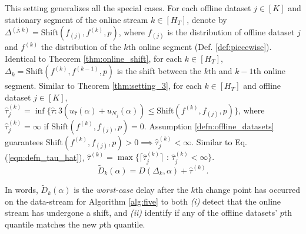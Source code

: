 \label{sec:general_setting}
This setting generalizes all the special cases. 
For each offline dataset $j \in [K]$ and stationary segment of the online stream $k \in [H_T]$, denote by  $\Delta^{(j;k)} = \text{Shift}(f_{(j)}, f^{(k)},p)$, where $f_{(j)}$ is the distribution of offline dataset $j$ and $f^{(k)}$ the distribution of the $k$th online segment (Def. \ref{def:piecewise}). Identical to Theorem \ref{thm:online_shift}, for each $k \in [H_T]$,  $\Delta_k =  \text{Shift} (f^{(k)},f^{(k-1)},p)$ is the shift between the $k$th and $k-1$th online segment. Similar to Theorem \ref{thm:setting_3}, for each $k \in [H_T]$ and offline dataset $j \in [K]$,  $\widehat{\tau}_j^{(k)} = \inf \{ \widehat{\tau}: 3(u_{\widehat{\tau}}(\alpha) + u_{N_j}(\alpha)) \leq \text{Shift}(f^{(k)},f_{(j)},p) \}$, where $\widehat{\tau}_j^{(k)} = \infty$ if $\text{Shift}(f^{(k)},f_{(j)},p)=0$.  Assumption \ref{defn:offline_datasets} guarantees $\text{Shift}(f^{(k)},f_{(j)},p)>0\implies\widehat{\tau}_j^{(k)}  < \infty$. Similar to Eq. (\ref{eqn:defn_tau_hat}),  $\widehat{\tau}^{(k)} = \max \{ \lceil \widehat{\tau}_j^{(k)} \rceil \text{ : } \widehat{\tau}_j^{(k)}  < \infty \}.$
\begin{equation}
    \widetilde{D}_k(\alpha) = D(\Delta_k,\alpha) + \widehat{\tau}^{(k)}.
    \label{eqn:D_tilde}
\end{equation}

In words, $\widetilde{D}_k(\alpha)$ is the \emph{worst-case} delay after the $k$th change point has occurred on the data-stream for Algorithm \ref{alg:five} to both {\em(i)} detect that the online stream has undergone a shift, and {\em(ii)} identify if any of the offline datasets' $p$th quantile matches the new $p$th quantile. 


